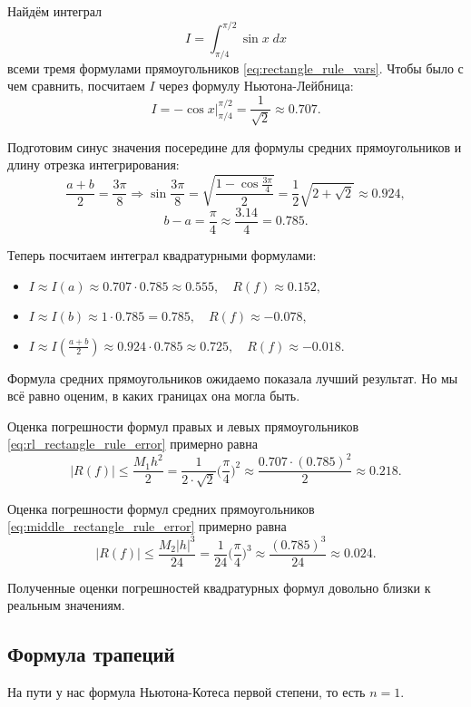 \documentclass[../main.tex]{subfile}
\begin{document}
\begin{example}\label{eq:rectangle_rules_example}
	Найдём интеграл
	\[I=\int_{\pi/4}^{\pi/2}\sin x\;dx\]
	всеми тремя формулами прямоугольников \eqref{eq:rectangle_rule_vars}.
	Чтобы было с чем сравнить, посчитаем $I$ через формулу Ньютона-Лейбница:
	\[I=-\cos x\Big|_{\pi/4}^{\pi/2}=\frac{1}{\sqrt 2}\approx 0.707.\]

	Подготовим синус значения посередине для формулы средних прямоугольников
	и длину отрезка интегрирования:
	\[\frac{a+b}{2}=\frac{3\pi}{8}\Rightarrow\sin{\frac{3\pi}{8}}=
	\sqrt{\frac{1-\cos{\frac{3\pi}{4}}}{2}}=\frac{1}{2}\sqrt{2+\sqrt{2}}
	\approx 0.924,\]
	\[b-a=\frac{\pi}{4}\approx\frac{3.14}{4}=0.785.\]

	Теперь посчитаем интеграл квадратурными формулами:
	\begin{itemize}[nosep]
		\item $I\approx I(a)\approx 0.707\cdot 0.785\approx 0.555,\quad
			R(f)\approx 0.152,$
		\item $I\approx I(b)\approx 1\cdot 0.785=0.785,\quad
			R(f)\approx -0.078,$
		\item $I\approx I(\frac{a+b}{2})\approx 0.924\cdot 0.785\approx
			0.725,\quad R(f)\approx -0.018.$
	\end{itemize}\leavevmode\newline

	Формула средних прямоугольников ожидаемо показала лучший результат.
	Но мы всё равно оценим, в каких границах она могла быть.

	Оценка погрешности формул правых и левых прямоугольников
	\eqref{eq:rl_rectangle_rule_error} примерно равна
	\[|R(f)|\le\frac{M_1h^2}{2}=\frac{1}{2\cdot\sqrt 2}\Big(\frac{\pi}{4}
	\Big)^2\approx \frac{0.707\cdot(0.785)^2}{2}\approx 0.218.\]

	Оценка погрешности формул средних прямоугольников
	\eqref{eq:middle_rectangle_rule_error} примерно равна
	\[|R(f)|\le\frac{M_2|h|^3}{24}=\frac{1}{24}\Big(\frac{\pi}{4}\Big)^3
	\approx\frac{(0.785)^3}{24}\approx 0.024.\]

	Полученные оценки погрешностей квадратурных формул довольно близки к
	реальным значениям.
\end{example}

\subsection{Формула трапеций}
На пути у нас формула Ньютона-Котеса первой степени, то есть $n=1$.
\end{document}
